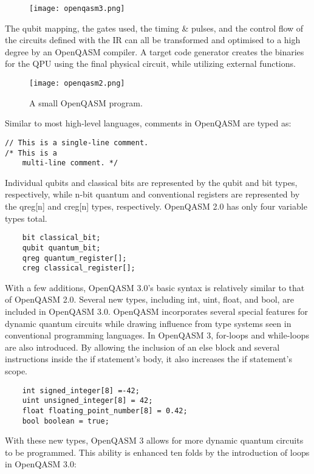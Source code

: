 \documentclass[conference]{IEEEtran}
\begin{document}
\begin{figure}[H]
\centering
\centerline{\texttt{[image: openqasm3.png]}}
\caption{}\label{}
\end{figure}

The qubit mapping, the gates used, the timing \& pulses, and the control flow of the circuits defined with the IR can all be transformed and optimised to a high degree by an OpenQASM compiler. A target code generator creates the binaries for the QPU using the final physical circuit, while utilizing external functions.

\begin{figure}[H]
\centering
\centerline{\texttt{[image: openqasm2.png]}}
\caption{A small OpenQASM program.}\label{}
\end{figure}

Similar to most high-level languages, comments in OpenQASM are typed as: 
\begin{lstlisting}
// This is a single-line comment. 
/* This is a 
    multi-line comment. */
\end{lstlisting}
Individual qubits and classical bits are represented by the qubit and bit types, respectively, while n-bit quantum and conventional registers are represented by the qreg[n] and creg[n] types, respectively. OpenQASM 2.0 has only four variable types total.
\begin{lstlisting}
    bit classical_bit;
    qubit quantum_bit; 
    qreg quantum_register[]; 
    creg classical_register[];
\end{lstlisting}
With a few additions, OpenQASM 3.0's basic syntax is relatively similar to that of OpenQASM 2.0. Several new types, including int, uint, float, and bool, are included in OpenQASM 3.0. OpenQASM incorporates several special features for dynamic quantum circuits while drawing influence from type systems seen in conventional programming languages. In OpenQASM 3, for-loops and while-loops are also introduced. By allowing the inclusion of an else block and several instructions inside the if statement's body, it also increases the if statement's scope.

\begin{lstlisting}
    int signed_integer[8] =-42; 
    uint unsigned_integer[8] = 42; 
    float floating_point_number[8] = 0.42; 
    bool boolean = true;
\end{lstlisting}
With these new types, OpenQASM 3 allows for more dynamic quantum circuits to be programmed. This ability is enhanced ten folds by the introduction of loops in OpenQASM 3.0:
\end{document}
